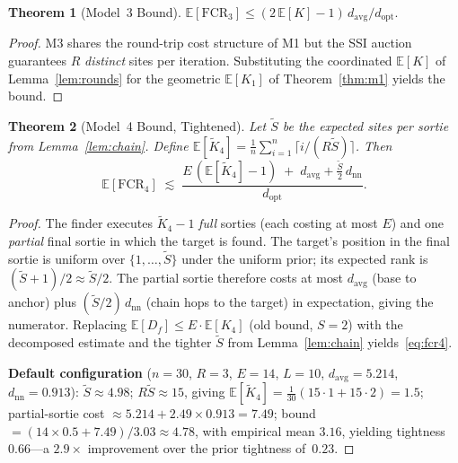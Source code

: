 \documentclass[conference]{IEEEtran}
\newtheorem{theorem}{Theorem}
\begin{document}
\begin{theorem}[Model~3 Bound]\label{thm:m3}
$\mathbb{E}[\mathrm{FCR}_3] \leq
(2\,\mathbb{E}[K]-1)\,d_{\mathrm{avg}}/d_{\mathrm{opt}}.$
\end{theorem}
\begin{proof}
M3 shares the round-trip cost structure of M1 but the SSI auction guarantees
$R$ \emph{distinct} sites per iteration.
Substituting the coordinated $\mathbb{E}[K]$ of Lemma~\ref{lem:rounds} for
the geometric $\mathbb{E}[K_1]$ of Theorem~\ref{thm:m1} yields the bound.
\end{proof}

\begin{theorem}[Model~4 Bound, Tightened]\label{thm:m4}
Let $\tilde{S}$ be the expected sites per sortie from Lemma~\ref{lem:chain}.
Define $\mathbb{E}[\tilde{K}_4] = \frac{1}{n}\sum_{i=1}^{n}\lceil i/(R\tilde{S})\rceil$.
Then
\begin{equation}\label{eq:fcr4}
  \mathbb{E}[\mathrm{FCR}_4] \;\lesssim\;
  \frac{E\,(\mathbb{E}[\tilde{K}_4] - 1) \;+\; d_{\mathrm{avg}}
        + \tfrac{\tilde{S}}{2}\,d_{\mathrm{nn}}}{d_{\mathrm{opt}}}.
\end{equation}
\end{theorem}
\begin{proof}
The finder executes $\tilde{K}_4 - 1$ \emph{full} sorties (each costing at
most $E$) and one \emph{partial} final sortie in which the target is found.
The target's position in the final sortie is uniform over $\{1,\ldots,\tilde{S}\}$
under the uniform prior; its expected rank is $(\tilde{S}+1)/2 \approx \tilde{S}/2$.
The partial sortie therefore costs at most $d_{\mathrm{avg}}$ (base to anchor)
plus $(\tilde{S}/2)\,d_{\mathrm{nn}}$ (chain hops to the target) in expectation,
giving the numerator.
Replacing $\mathbb{E}[D_f] \leq E \cdot \mathbb{E}[K_4]$ (old bound, $S{=}2$)
with the decomposed estimate and the tighter $\tilde{S}$ from
Lemma~\ref{lem:chain} yields~\eqref{eq:fcr4}.

\noindent\textbf{Default configuration} ($n{=}30$, $R{=}3$, $E{=}14$,
$L{=}10$, $d_{\mathrm{avg}}{=}5.214$, $d_{\mathrm{nn}}{=}0.913$):
$\tilde{S} \approx 4.98$;
$R\tilde{S} \approx 15$, giving
$\mathbb{E}[\tilde{K}_4] = \frac{1}{30}(15{\cdot}1+15{\cdot}2) = 1.5$;
partial-sortie cost $\approx 5.214 + 2.49{\times}0.913 = 7.49$;
bound $= (14{\times}0.5 + 7.49)/3.03 \approx \mathbf{4.78}$,
with empirical mean $3.16$, yielding tightness~$\mathbf{0.66}$---a $2.9{\times}$
improvement over the prior tightness of~$0.23$.
\end{proof}
\end{document}
